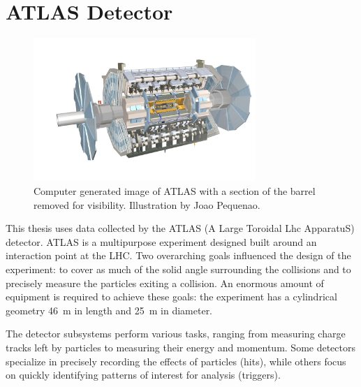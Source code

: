 \section{ATLAS Detector}

\begin{figure}[h!]
\captionsetup[subfigure]{position=b}
\centering
\includegraphics[width=0.75\textwidth]{figures/experiment/atlas/atlasLayout.jpg}
\caption[Computer generated image of ATLAS with a section of the barrel removed for visibility. Illustration by Joao Pequenao.]{Computer generated image of ATLAS with a section of the barrel removed for visibility. Illustration by Joao Pequenao\footnotemark.}
\label{fig:atlas3d}
\end{figure}


This thesis uses data collected by the ATLAS (A Large Toroidal Lhc ApparatuS) detector.
ATLAS is a multipurpose experiment designed built around an interaction point at the LHC.
Two overarching goals influenced the design of the experiment: to cover as much of the solid angle surrounding the collisions and to precisely measure the particles exiting a collision.
An enormous amount of equipment is required to achieve these goals: the experiment has a cylindrical geometry 46~m in length and 25~m in diameter.

The detector subsystems perform various tasks, ranging from measuring charge tracks left by particles to measuring their energy and momentum.
Some detectors specialize in precisely recording the effects of particles (hits), while others focus on quickly identifying patterns of interest for analysis (triggers).

